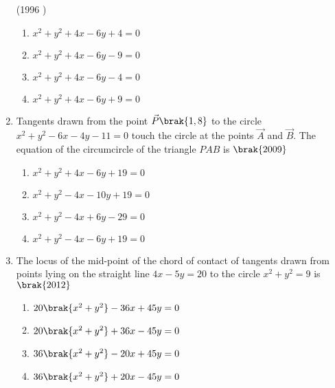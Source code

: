 \begin{enumerate}
    \hfill {(1996 )}
    \begin{multicols}{2}
\begin{multicols}{2}
\begin{enumerate}
    	\item $x^{2}+y^{2}+4x-6y+4=0$
    	\item $x^{2}+y^{2}+4x-6y-9=0$
    	\item $x^{2}+y^{2}+4x-6y-4=0$
    	\item $x^{2}+y^{2}+4x-6y+9=0$
    \end{enumerate}
\end{multicols}
\end{multicols}
         \item Tangents drawn from the point $\vec{P}\brak{1, 8}$ to the circle $x^2+y^2-6x-4y-11=0$ touch the circle at the points $\vec{A}$ and $\vec{B}$. The equation of the circumcircle of the triangle $PAB$ is
             \hfill$\brak{2009}$
             \begin{multicols}{2}
\begin{multicols}{2}
\begin{enumerate}
             \item $x^2+y^2+4x-6y+19=0$
             \item $x^2+y^2-4x-10y+19=0$
             \item $x^2+y^2-4x+6y-29=0$
             \item $x^2+y^2-4x-6y+19=0$
             \end{enumerate}
\end{multicols}
\end{multicols}
             \item The locus of the mid-point of the chord of contact of tangents drawn from points lying on the straight line $4x-5y=20$ to the circle $x^2+y^2=9$ is
                 \hfill$\brak{2012}$
             \begin{multicols}{2}
\begin{multicols}{2}
\begin{enumerate}
                 \item $20\brak{x^2+y^2}-36x+45y=0$
                 \item $20\brak{x^2+y^2}+36x-45y=0$
                 \item $36\brak{x^2+y^2}-20x+45y=0$
                 \item $36\brak{x^2+y^2}+20x-45y=0$
             \end{enumerate}
\end{multicols}
             \end{multicols}

\end{enumerate}
